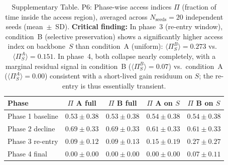\documentclass[11pt]{article}
\begin{document}
\begin{table}[t]
\centering
\caption{Supplementary Table. P6: Phase-wise access indices $\Pi$ (fraction of time inside the access region), averaged across $N_{\mathrm{seeds}} = 20$ independent seeds (mean~$\pm$~SD). \textbf{Critical finding:} In phase~3 (re-entry window), condition~B (selective preservation) shows a significantly higher access index on backbone~$S$ than condition~A (uniform): $\langle\Pi_S^B\rangle = 0.273$ vs.\ $\langle\Pi_S^A\rangle = 0.151$. In phase~4, both collapse nearly completely, with a marginal residual signal in condition~B ($\langle\Pi_S^B\rangle = 0.07$) vs.\ condition~A ($\langle\Pi_S^A\rangle = 0.00$) consistent with a short-lived gain residuum on $S$; the re-entry is thus essentially transient.}
\label{tab:v5}
\begin{tabular}{lcccc}
\hline
Phase & $\Pi$ A full & $\Pi$ B full & $\Pi$ A on $S$ & $\Pi$ B on $S$ \\
\hline
Phase 1 baseline   & $0.53 \pm 0.38$ & $0.53 \pm 0.38$ & $0.54 \pm 0.38$ & $0.54 \pm 0.38$ \\
Phase 2 decline   & $0.69 \pm 0.33$ & $0.69 \pm 0.33$ & $0.61 \pm 0.33$ & $0.61 \pm 0.33$ \\
Phase 3 re-entry  & $0.09 \pm 0.12$ & $0.09 \pm 0.13$ & $\mathbf{0.15 \pm 0.19}$ & $\mathbf{0.27 \pm 0.27}$ \\
Phase 4 final     & $0.00 \pm 0.00$ & $0.00 \pm 0.00$ & $0.00 \pm 0.00$ & $0.07 \pm 0.11$ \\
\hline
\end{tabular}
\end{table}
\end{document}
